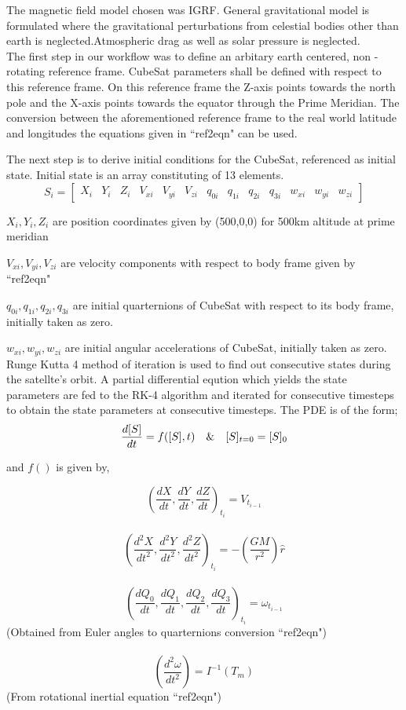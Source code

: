 \documentclass[11pt]{report}
\begin{document}
	The magnetic field model chosen was IGRF. General gravitational model is formulated where the gravitational perturbations from celestial bodies other than earth is neglected.Atmospheric drag as well as solar pressure is neglected.\\
	
	The first step in our workflow was to define an arbitary earth centered, non - rotating reference frame. CubeSat parameters shall be defined with respect to this reference frame. On this reference frame the Z-axis points towards the north pole and the X-axis points towards the equator through the Prime Meridian. The conversion between the aforementioned reference frame to the real world latitude and longitudes the equations given in ``ref2eqn" can be used.
	
	The next step is to derive initial conditions for the CubeSat, referenced as initial state. Initial state is an array constituting of 13 elements. $$S_i = [\begin{array}{lllllllllllll}
		X_i & Y_i & Z_i & V_{xi} & V_{yi} & V_{zi} & q_{0i} & q_{1i} & q_{2i} & q_{3i} & w_{xi} & w_{yi} & w_{zi}
	\end{array}]$$
	
	$X_i,Y_i,Z_i$ are position coordinates given by (500,0,0) for 500km altitude at prime meridian
	
	$V_{xi},V_{yi},V_{zi}$ are velocity components with respect to body frame given by ``ref2eqn"
	
	$q_{0i},q_{1i},q_{2i},q_{3i}$ are initial quarternions of CubeSat with respect to its body frame, initially taken as zero.
	
	$w_{xi},w_{yi},w_{zi}$ are initial angular accelerations of CubeSat, initially taken as zero.\\
	
	Runge Kutta 4 method of iteration is used to find out consecutive states during the satellte's orbit. A partial differential eqution which yields the state parameters are fed to the RK-4 algorithm and iterated for consecutive timesteps to obtain the state parameters at consecutive timesteps. The PDE is of the form;$$\frac{d[S]}{dt} = f([S],t) \text{\hspace{10pt}\&\hspace{10pt}} [S]_{t=0} = [S]_0$$
	
	\noindent and $f()$ is given by,
	
	$$\left(\frac{dX}{dt},\frac{dY}{dt},\frac{dZ}{dt}\right)_{t_i} = V_{t_{i-1}}$$\\
	$$\left(\frac{d^2X}{dt^2},\frac{d^2Y}{dt^2},\frac{d^2Z}{dt^2}\right)_{t_i} = -\left(\frac{GM}{r^2}\right)\hat{r}$$\\
	$$\left(\frac{dQ_0}{dt},\frac{dQ_1}{dt},\frac{dQ_2}{dt},\frac{dQ_3}{dt}\right)_{t_i} = \omega_{t_{i-1}}$$
	\hspace{35pt} (Obtained from Euler angles to quarternions conversion ``ref2eqn")\\\\
	$$\left(\frac{d^2\omega}{dt^2}\right) = I^{-1}(T_m)$$
	\hspace{100pt} (From rotational inertial equation ``ref2eqn")\\\\
	
\end{document}
